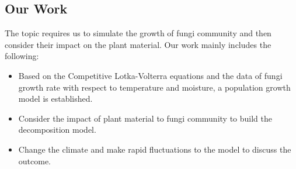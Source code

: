 	
	\subsection{Our Work}
	The topic requires us to simulate the growth of fungi community and then consider their impact on the plant material. Our work mainly includes the following:
	\begin{itemize}
		\item Based on the Competitive Lotka-Volterra equations and the data of fungi growth rate with respect to temperature and moisture, a population growth model is established.
		\item Consider the impact of plant material to fungi community to build the decomposition model.
		\item Change the climate and make rapid fluctuations to the model to discuss the outcome.
	\end{itemize}	